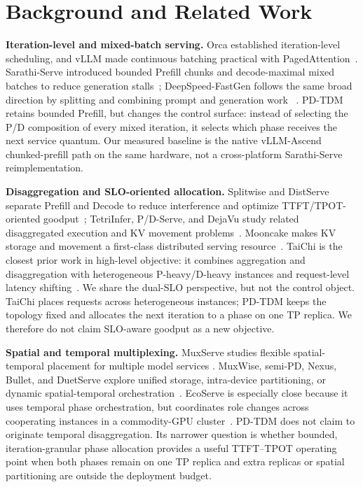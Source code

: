 \section{Background and Related Work}
\label{sec:background}

\textbf{Iteration-level and mixed-batch serving.}
Orca established iteration-level scheduling, and vLLM made continuous batching
practical with PagedAttention~\cite{yu2022orca,kwon2023vllm}. Sarathi-Serve
introduced bounded Prefill chunks and decode-maximal mixed batches to reduce
generation stalls~\cite{agrawal2024sarathi}; DeepSpeed-FastGen follows the same
broad direction by splitting and combining prompt and generation work
~\cite{holmes2024fastgen}. PD-TDM retains bounded Prefill, but changes the
control surface: instead of selecting the P/D composition of every mixed
iteration, it selects which phase receives the next service quantum. Our
measured baseline is the native vLLM-Ascend chunked-prefill path on the same
hardware, not a cross-platform Sarathi-Serve reimplementation.

\textbf{Disaggregation and SLO-oriented allocation.}
Splitwise and DistServe separate Prefill and Decode to reduce interference and
optimize TTFT/TPOT-oriented goodput~\cite{patel2024splitwise,
zhong2024distserve}; TetriInfer, P/D-Serve, and DejaVu study related
disaggregated execution and KV movement problems~\cite{hu2024tetrinfer,
jin2024pdserve,strati2024dejavu}. Mooncake makes KV storage and movement a
first-class distributed serving resource~\cite{qin2025mooncake}. TaiChi is the
closest prior work in high-level objective: it combines aggregation and
disaggregation with heterogeneous P-heavy/D-heavy instances and request-level
latency shifting~\cite{wang2025taichi}. We share the dual-SLO perspective, but
not the control object. TaiChi places requests across heterogeneous instances;
PD-TDM keeps the topology fixed and allocates the next iteration to a phase on
one TP replica. We therefore do not claim SLO-aware goodput as a new
objective.

\textbf{Spatial and temporal multiplexing.}
MuxServe studies flexible spatial-temporal placement for multiple model services
\cite{duan2024muxserve}. MuxWise, semi-PD, Nexus, Bullet, and DuetServe explore
unified storage, intra-device partitioning, or dynamic spatial-temporal
orchestration~\cite{chen2026muxwise,hong2025semipd,shi2025nexus,
lin2026bullet,gao2026duetserve}. EcoServe is especially close because it uses
temporal phase orchestration, but coordinates role changes across cooperating
instances in a commodity-GPU cluster~\cite{du2026ecoserve}. PD-TDM does not
claim to originate temporal disaggregation. Its narrower question is whether
bounded, iteration-granular phase allocation provides a useful TTFT--TPOT
operating point when both phases remain on one TP replica and extra replicas or
spatial partitioning are outside the deployment budget.
